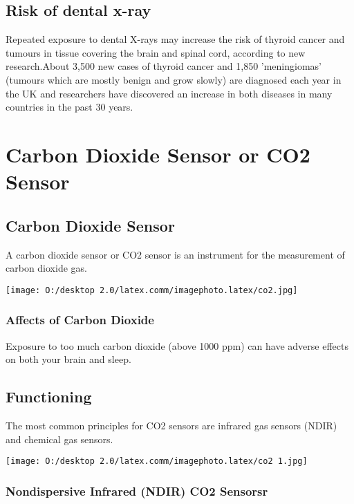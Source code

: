 \documentclass[12pt]{article}
\begin{document}
\subsection{Risk of dental x-ray} 

 Repeated exposure to dental X-rays may increase the risk of thyroid cancer and tumours in tissue covering the brain and spinal cord, according to new research.About 3,500 new cases of thyroid cancer and 1,850 'meningiomas' (tumours which are mostly benign and grow slowly) are diagnosed each year in the UK and researchers have discovered an increase in both diseases in many countries in the past 30 years.



\section{ Carbon Dioxide Sensor or CO2 Sensor}
\subsection{Carbon Dioxide Sensor}

A carbon dioxide sensor or CO2 sensor is an instrument for the measurement of carbon dioxide gas.

\texttt{[image: O:/desktop 2.0/latex.comm/imagephoto.latex/co2.jpg]} 
 


\subsubsection{Affects of Carbon Dioxide}

 Exposure to too much carbon dioxide (above 1000 ppm) can have adverse effects on both your brain and sleep.

\subsection{Functioning}

The most common principles for CO2 sensors are infrared gas sensors (NDIR) and chemical gas sensors.

\texttt{[image: O:/desktop 2.0/latex.comm/imagephoto.latex/co2 1.jpg]}


\subsubsection{Nondispersive Infrared (NDIR) CO2 Sensorsr}
\end{document}
